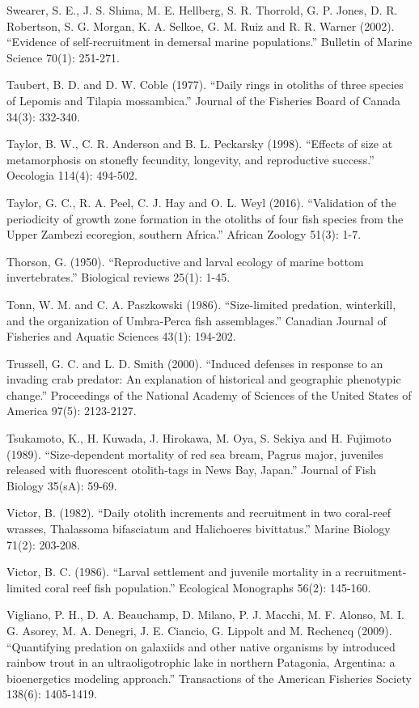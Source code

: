 \documentclass[]{book}
\begin{document}
Swearer, S. E., J. S. Shima, M. E. Hellberg, S. R. Thorrold, G. P.
Jones, D. R. Robertson, S. G. Morgan, K. A. Selkoe, G. M. Ruiz and R. R.
Warner (2002). ``Evidence of self-recruitment in demersal marine
populations.'' Bulletin of Marine Science 70(1): 251-271.

Taubert, B. D. and D. W. Coble (1977). ``Daily rings in otoliths of
three species of Lepomis and Tilapia mossambica.'' Journal of the
Fisheries Board of Canada 34(3): 332-340.

Taylor, B. W., C. R. Anderson and B. L. Peckarsky (1998). ``Effects of
size at metamorphosis on stonefly fecundity, longevity, and reproductive
success.'' Oecologia 114(4): 494-502.

Taylor, G. C., R. A. Peel, C. J. Hay and O. L. Weyl (2016). ``Validation
of the periodicity of growth zone formation in the otoliths of four fish
species from the Upper Zambezi ecoregion, southern Africa.'' African
Zoology 51(3): 1-7.

Thorson, G. (1950). ``Reproductive and larval ecology of marine bottom
invertebrates.'' Biological reviews 25(1): 1-45.

Tonn, W. M. and C. A. Paszkowski (1986). ``Size-limited predation,
winterkill, and the organization of Umbra-Perca fish assemblages.''
Canadian Journal of Fisheries and Aquatic Sciences 43(1): 194-202.

Trussell, G. C. and L. D. Smith (2000). ``Induced defenses in response
to an invading crab predator: An explanation of historical and
geographic phenotypic change.'' Proceedings of the National Academy of
Sciences of the United States of America 97(5): 2123-2127.

Tsukamoto, K., H. Kuwada, J. Hirokawa, M. Oya, S. Sekiya and H. Fujimoto
(1989). ``Size‐dependent mortality of red sea bream, Pagrus major,
juveniles released with fluorescent otolith‐tags in News Bay, Japan.''
Journal of Fish Biology 35(sA): 59-69.

Victor, B. (1982). ``Daily otolith increments and recruitment in two
coral-reef wrasses, Thalassoma bifasciatum and Halichoeres bivittatus.''
Marine Biology 71(2): 203-208.

Victor, B. C. (1986). ``Larval settlement and juvenile mortality in a
recruitment‐limited coral reef fish population.'' Ecological Monographs
56(2): 145-160.

Vigliano, P. H., D. A. Beauchamp, D. Milano, P. J. Macchi, M. F. Alonso,
M. I. G. Asorey, M. A. Denegri, J. E. Ciancio, G. Lippolt and M.
Rechencq (2009). ``Quantifying predation on galaxiids and other native
organisms by introduced rainbow trout in an ultraoligotrophic lake in
northern Patagonia, Argentina: a bioenergetics modeling approach.''
Transactions of the American Fisheries Society 138(6): 1405-1419.
\end{document}
